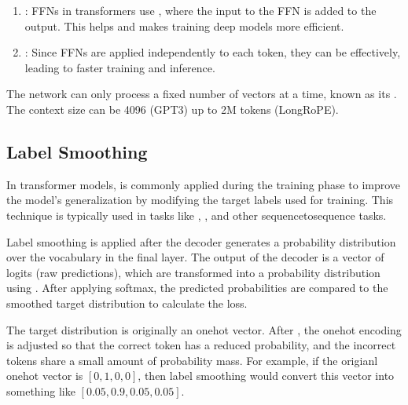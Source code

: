 \documentclass[letterpaper,11pt,english]{sphinxmanual}
\begin{document}
\begin{enumerate}
\item {} 
\sphinxAtStartPar
{}: FFNs in transformers use , where the input to the FFN is added to the output.
This helps  and makes training
deep models more efficient.

\item {} 
\sphinxAtStartPar
{}: Since FFNs are applied independently to each
token, they can be  effectively, leading to faster
training and inference.

\end{enumerate}

\sphinxAtStartPar
The network can only process a fixed number of vectors at a time, known
as its . The context size can be 4096 (GPT\sphinxhyphen{}3) up to 2M
tokens (LongRoPE).


\subsection{Label Smoothing}
\label{\detokenize{pretraining:label-smoothing}}
\sphinxAtStartPar
In transformer models,  is commonly applied during
the training phase to improve the model’s generalization by modifying
the target labels used for training. This technique is typically used in
tasks like , , and other
sequence\sphinxhyphen{}to\sphinxhyphen{}sequence tasks.

\sphinxAtStartPar
Label smoothing is applied after the decoder generates a probability
distribution over the vocabulary in the final layer. The output of the
decoder is a vector of logits (raw predictions), which are transformed
into a probability distribution using . After applying
softmax, the predicted probabilities are compared to the smoothed target
distribution to calculate the loss.

\sphinxAtStartPar
The target distribution is originally an one\sphinxhyphen{}hot vector. After , the one\sphinxhyphen{}hot encoding is adjusted so that the correct token
has a reduced probability, and the incorrect tokens share a small amount
of probability mass. For example, if the origianl one\sphinxhyphen{}hot vector is
\([0, 1, 0, 0]\), then label smoothing would convert this vector
into something like \([0.05, 0.9, 0.05, 0.05]\).
\end{document}

